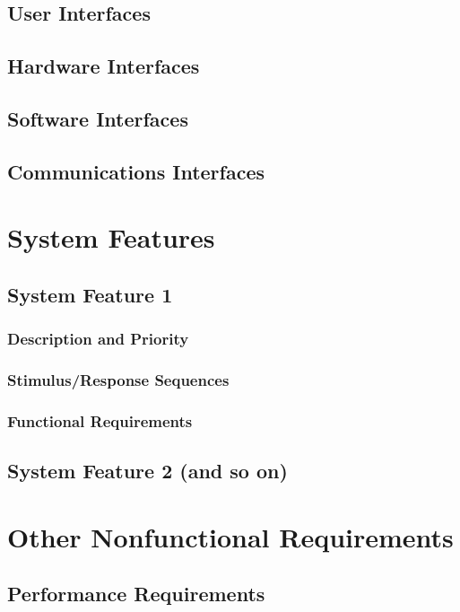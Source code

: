 \documentclass{scrreprt}
\begin{document}
\section{User Interfaces}

\section{Hardware Interfaces}

\section{Software Interfaces}

\section{Communications Interfaces}

\chapter{System Features}

\section{System Feature 1}

\subsection{Description and Priority}

\subsection{Stimulus/Response Sequences}

\subsection{Functional Requirements}

\section{System Feature 2 (and so on)}


\chapter{Other Nonfunctional Requirements}

\section{Performance Requirements}
\end{document}
